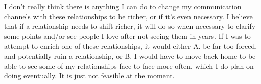 \documentclass[12pt]{article}
\begin{document}
\par
I don't really think there is anything I can do to change my communication channels with these relationships to be richer, or if it's even necessary. I believe that if a relationship needs to shift richer, it will do so when necessary to clarify some points and/or see people I love after not seeing them in years. If I was to attempt to enrich one of these relationships, it would either A. be far too forced, and potentially ruin a relationship, or B. I would have to move back home to be able to see some of my relationships face to face more often, which I do plan on doing eventually. It is just not feasible at the moment.
\end{document}
